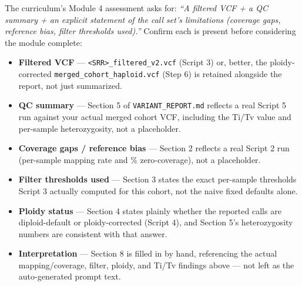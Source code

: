 \documentclass[
]{article}
\providecommand{\tightlist}{%
  \setlength{\itemsep}{0pt}\setlength{\parskip}{0pt}}
\begin{document}
The curriculum's Module 4 assessment asks for: \emph{``A filtered VCF +
a QC summary + an explicit statement of the call set's limitations
(coverage gaps, reference bias, filter thresholds used).''} Confirm each
is present before considering the module complete:

\begin{itemize}
\tightlist
\item[$\square$]
  \textbf{Filtered VCF} ---
  \texttt{\textless{}SRR\textgreater{}\_filtered\_v2.vcf} (Script 3) or,
  better, the ploidy-corrected \texttt{merged\_cohort\_haploid.vcf}
  (Step 6) is retained alongside the report, not just summarized.
\item[$\square$]
  \textbf{QC summary} --- Section 5 of \texttt{VARIANT\_REPORT.md}
  reflects a real Script 5 run against your actual merged cohort VCF,
  including the Ti/Tv value and per-sample heterozygosity, not a
  placeholder.
\item[$\square$]
  \textbf{Coverage gaps / reference bias} --- Section 2 reflects a real
  Script 2 run (per-sample mapping rate and \% zero-coverage), not a
  placeholder.
\item[$\square$]
  \textbf{Filter thresholds used} --- Section 3 states the exact
  per-sample thresholds Script 3 actually computed for this cohort, not
  the naive fixed defaults alone.
\item[$\square$]
  \textbf{Ploidy status} --- Section 4 states plainly whether the
  reported calls are diploid-default or ploidy-corrected (Script 4), and
  Section 5's heterozygosity numbers are consistent with that answer.
\item[$\square$]
  \textbf{Interpretation} --- Section 8 is filled in by hand,
  referencing the actual mapping/coverage, filter, ploidy, and Ti/Tv
  findings above --- not left as the auto-generated prompt text.
\end{itemize}
\end{document}
